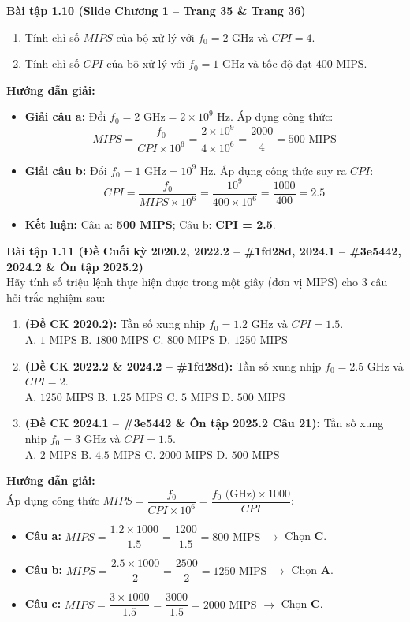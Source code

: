 \textbf{Bài tập 1.10 (Slide Chương 1 -- Trang 35 \& Trang 36)}
\begin{enumerate}[label=\alph*)]
    \item Tính chỉ số $MIPS$ của bộ xử lý với $f_0 = 2\text{ GHz}$ và $CPI = 4$.
    \item Tính chỉ số $CPI$ của bộ xử lý với $f_0 = 1\text{ GHz}$ và tốc độ đạt $400\text{ MIPS}$.
\end{enumerate}
\textbf{Hướng dẫn giải:}
\begin{itemize}
    \item \textbf{Giải câu a:} Đổi $f_0 = 2\text{ GHz} = 2 \times 10^9\text{ Hz}$. Áp dụng công thức:
    $$MIPS = \frac{f_0}{CPI \times 10^6} = \frac{2 \times 10^9}{4 \times 10^6} = \frac{2000}{4} = 500\text{ MIPS}$$
    \item \textbf{Giải câu b:} Đổi $f_0 = 1\text{ GHz} = 10^9\text{ Hz}$. Áp dụng công thức suy ra $CPI$:
    $$CPI = \frac{f_0}{MIPS \times 10^6} = \frac{10^9}{400 \times 10^6} = \frac{1000}{400} = 2.5$$
    \item \textbf{Kết luận:} Câu a: \textbf{500 MIPS}; Câu b: \textbf{CPI = 2.5}.
\end{itemize}

\textbf{Bài tập 1.11 (Đề Cuối kỳ 2020.2, 2022.2 -- \#1fd28d, 2024.1 -- \#3e5442, 2024.2 \& Ôn tập 2025.2)}\\
Hãy tính số triệu lệnh thực hiện được trong một giây (đơn vị MIPS) cho 3 câu hỏi trắc nghiệm sau:
\begin{enumerate}[label=\alph*)]
    \item \textbf{(Đề CK 2020.2):} Tần số xung nhịp $f_0 = 1.2\text{ GHz}$ và $CPI = 1.5$.\\
    A. $1\text{ MIPS}$ \quad B. $1800\text{ MIPS}$ \quad C. $800\text{ MIPS}$ \quad D. $1250\text{ MIPS}$
    \item \textbf{(Đề CK 2022.2 \& 2024.2 -- \#1fd28d):} Tần số xung nhịp $f_0 = 2.5\text{ GHz}$ và $CPI = 2$.\\
    A. $1250\text{ MIPS}$ \quad B. $1.25\text{ MIPS}$ \quad C. $5\text{ MIPS}$ \quad D. $500\text{ MIPS}$
    \item \textbf{(Đề CK 2024.1 -- \#3e5442 \& Ôn tập 2025.2 Câu 21):} Tần số xung nhịp $f_0 = 3\text{ GHz}$ và $CPI = 1.5$.\\
    A. $2\text{ MIPS}$ \quad B. $4.5\text{ MIPS}$ \quad C. $2000\text{ MIPS}$ \quad D. $500\text{ MIPS}$
\end{enumerate}
\textbf{Hướng dẫn giải:}\\
Áp dụng công thức $MIPS = \dfrac{f_0}{CPI \times 10^6} = \dfrac{f_0\text{ (GHz)} \times 1000}{CPI}$:
\begin{itemize}
    \item \textbf{Câu a:} $MIPS = \dfrac{1.2 \times 1000}{1.5} = \dfrac{1200}{1.5} = 800\text{ MIPS}$ $\rightarrow$ Chọn \textbf{C}.
    \item \textbf{Câu b:} $MIPS = \dfrac{2.5 \times 1000}{2} = \dfrac{2500}{2} = 1250\text{ MIPS}$ $\rightarrow$ Chọn \textbf{A}.
    \item \textbf{Câu c:} $MIPS = \dfrac{3 \times 1000}{1.5} = \dfrac{3000}{1.5} = 2000\text{ MIPS}$ $\rightarrow$ Chọn \textbf{C}.
\end{itemize}

